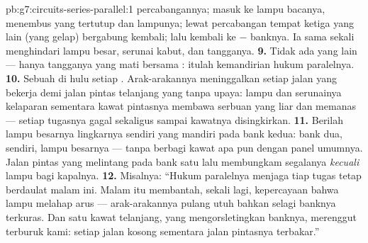 \begin{solution}{pb:g7:circuits-series-parallel:1}
percabangannya; masuk ke  lampu bacanya, menembus 
yang tertutup dan lampunya; lewat percabangan tempat ketiga 
yang lain (yang gelap) bergabung kembali; lalu kembali ke $-$ banknya.
Ia sama sekali menghindari  lampu besar, serunai kabut, dan
tangganya.
\textbf{9.} Tidak ada yang lain --- hanya  tangganya yang mati
bersama : itulah kemandirian hukum paralelnya.
\textbf{10.} Sebuah  di hulu setiap .
Arak-arakannya meninggalkan setiap jalan yang bekerja demi jalan
pintas telanjang yang tanpa upaya: lampu dan serunainya kelaparan
sementara kawat pintasnya membawa serbuan yang liar dan memanas ---
setiap tugasnya gagal sekaligus sampai kawatnya disingkirkan.
\textbf{11.} Berilah lampu besarnya lingkarnya sendiri yang mandiri
pada bank kedua: bank dua,  sendiri, lampu besarnya ---
tanpa berbagi kawat apa pun dengan panel umumnya. Jalan pintas yang
melintang pada bank satu lalu membungkam segalanya \emph{kecuali}
lampu bagi kapalnya.
\textbf{12.} Misalnya: ``Hukum paralelnya menjaga tiap tugas tetap
berdaulat malam ini. Malam itu membantah, sekali lagi, kepercayaan
bahwa lampu melahap arus --- arak-arakannya pulang utuh bahkan selagi
banknya terkuras. Dan satu kawat telanjang, yang mengorsletingkan
banknya, merenggut  terburuk kami: setiap jalan kosong sementara
jalan pintasnya terbakar.''
\end{solution}
